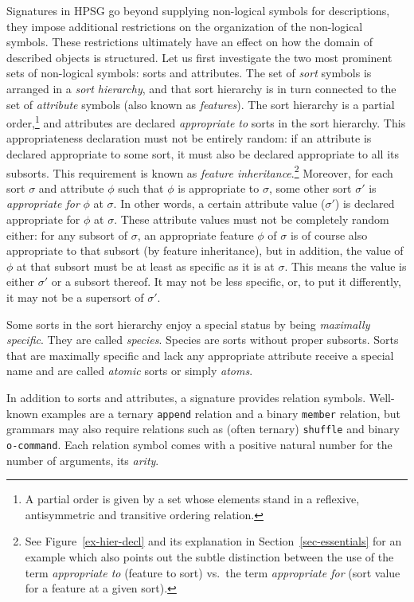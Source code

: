 \documentclass[output=paper,biblatex,babelshorthands,newtxmath,draftmode,colorlinks,citecolor=brown]{langscibook}
\begin{document}
{Signatures in HPSG go beyond supplying non-logical symbols for
descriptions, they impose additional restrictions on the
organization of the non-logical symbols. These restrictions ultimately have an effect on
how the domain of described objects is structured. Let us first
investigate the two most prominent sets of non-logical symbols: sorts
and attributes. The set of \emph{sort} symbols is arranged in a
\emph{sort hierarchy}, and that sort hierarchy is in turn connected to
the set of \emph{attribute} symbols (also known as
\emph{features}). The sort hierarchy is a partial order,\footnote{A partial order is given by a set whose elements stand in a reflexive,
antisymmetric and transitive ordering relation.} and
attributes are declared \emph{appropriate to} sorts
in the sort hierarchy. This appropriateness declaration must not be
entirely random: if an attribute is declared appropriate to some sort,
it must also be declared appropriate to all its subsorts. This requirement
is known as \emph{feature inheritance}.\footnote{See Figure~\ref{ex-hier-decl} and its explanation in Section~\ref{sec-essentials} for an example which also points out the subtle distinction between the use of the term \emph{appropriate to} (feature to sort) vs.\ the term \emph{appropriate for} (sort value for a feature at a given sort).}  Moreover, for each
sort $\sigma$ and attribute $\phi$ such that $\phi$ is appropriate to
$\sigma$, some other sort $\sigma'$ is \emph{appropriate for} $\phi$
at $\sigma$. In other words, a certain attribute value ($\sigma'$) is declared
appropriate for $\phi$ at $\sigma$. These attribute values must not be
completely random either: for any subsort of $\sigma$, an
appropriate feature $\phi$ of $\sigma$ is of course also appropriate
to that subsort (by feature inheritance), but in addition, the value of $\phi$ at that subsort
must be at least as specific as it is at $\sigma$. This means the value is either
$\sigma'$ or a subsort thereof. It may not be less specific, or, to put
it differently, it may not be a
supersort of $\sigma'$.

Some sorts in the sort hierarchy enjoy a special status by being
\emph{maximally specific}. They are called \emph{species}. Species
are sorts without proper subsorts.
Sorts that are maximally specific and lack any appropriate attribute receive
a special name and are called \emph{atomic} sorts or simply \emph{atoms}.

In addition to sorts and attributes, a signature provides relation
symbols.  Well-known examples are a ternary \texttt{append} relation
and a binary \texttt{member} relation, but grammars may also require
relations such as (often ternary) \texttt{shuffle} and binary
\texttt{o-command}. Each relation symbol comes with
a positive natural number for the number of arguments, its \emph{arity}.

}
\end{document}
